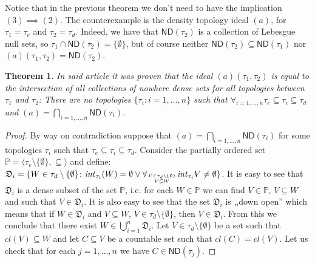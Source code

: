 \documentclass[12pt]{amsart}
\theoremstyle{plain}
\newtheorem{theorem}{Theorem}[section]
\theoremstyle{definition}
\theoremstyle{remark}
\newcommand{\cl}{\mathit{cl}}
\newcommand{\aideal}{\mathit{(a)}}
\newcommand{\ND}{\mathsf{ND}}
\begin{document}
Notice that in the previous theorem we don't need to have
the implication $(3) \implies (2)$. The counterexample 
is the density topology ideal $\aideal$, for $\tau_1 = \tau_e$
and $\tau_2 = \tau_d$. Indeed, we have 
that $\mathsf{ND}(\tau_2)$ is a collection of Lebesgue null sets, 
so $\tau_1 \cap \mathsf{ND}(\tau_2) = \lbrace \emptyset \rbrace$,
but of course neither $\mathsf{ND}(\tau_2) \subseteq \mathsf{ND}(\tau_1)$ 
nor $\aideal(\tau_1, \tau_2) = \mathsf{ND}(\tau_2)$.


\begin{theorem}
In said article it was proven that the ideal $\aideal(\tau_1, \tau_2)$
is equal to the intersection of all collections of nowhere dense sets
for all topologies between $\tau_1$ and $\tau_2$:
There are no topologies $\lbrace \tau_i \colon i = 1,\ldots, n\rbrace$
such that $\forall_{i = 1,\ldots, n} \tau_e \subseteq \tau_i \subseteq \tau_d$
and 
$\aideal = \bigcap_{i=1,\ldots,n} \ND(\tau_i)$.
\end{theorem}

\begin{proof}
By way on contradiction suppose that 
$\aideal = \bigcap_{i=1,\ldots,n} \ND(\tau_i)$ for some topologies 
 $\tau_i$ such that $\tau_e \subseteq \tau_i \subseteq \tau_d$.
Consider the partially ordered set 
$\mathbb{P} = \langle \tau_e\setminus\lbrace\emptyset\rbrace, \subseteq\rangle$
and define:
$\mathfrak{D}_i = \lbrace W \in \tau_d\setminus\lbrace\emptyset\rbrace \colon
\mathit{int}_{\tau_i}(W) = \emptyset \vee \forall_{V \in \tau_d\setminus\lbrace\emptyset\rbrace \atop V \subseteq W} \mathit{int}_{\tau_i} V \not= \emptyset\rbrace$.
It is easy to see that $\mathfrak{D}_i$ is a dense subset of 
the set $\mathbb{P}$, i.e. for each $W \in \mathbb{P}$ we can find
$V \in \mathbb{P}$, $V \subseteq W$ and such that $V \in \mathfrak{D}_i$. It is also
easy to see that the set 
$\mathfrak{D}_i$ is ,,down open'' which means that if
$W \in \mathfrak{D}_i$ and 
$V \subseteq W$, $V\in\tau_d\setminus\lbrace\emptyset\rbrace$, then $V \in \mathfrak{D}_i$. From this we conclude that there exist $W \in \bigcup_{i=1}^n \mathfrak{D}_i$. Let
$V \in \tau_d\setminus\lbrace\emptyset\rbrace$ be a set such that 
$\cl(V) \subseteq W$ and let $C \subseteq V$ be a countable set
such that $\cl(C) = \cl(V)$. Let us check that for each $j = 1,\ldots,n$
we have $C \in \ND(\tau_j)$.  
\end{proof}
\end{document}

